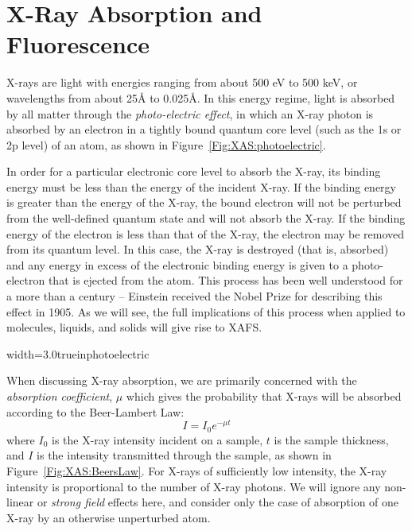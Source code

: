 \section{X-Ray Absorption and Fluorescence}

X-rays are light with energies ranging from about 500 eV to 500 keV, or
wavelengths from about 25{\AA} to 0.025{\AA}.  In this energy regime, light
is absorbed by all matter through the \emph{photo-electric effect}, in
which an X-ray photon is absorbed by an electron in a tightly bound quantum
core level (such as the 1s or 2p level) of an atom, as shown in
Figure~\ref{Fig:XAS:photoelectric}.

In order for a particular electronic core level to absorb the X-ray, its
binding energy must be less than the energy of the incident X-ray.  If the
binding energy is greater than the energy of the X-ray, the bound electron
will not be perturbed from the well-defined quantum state and will not
absorb the X-ray.  If the binding energy of the electron is less than that
of the X-ray, the electron may be removed from its quantum level.  In this
case, the X-ray is destroyed (that is, absorbed) and any energy in excess
of the electronic binding energy is given to a photo-electron that is
ejected from the atom.  This process has been well understood for a more
than a century -- Einstein received the Nobel Prize for describing this
effect in 1905.  As we will see, the full implications of this process when
applied to molecules, liquids, and solids will give rise to XAFS.

\begin{Nfig}{width=3.0truein}{photoelectric}
  \caption{The photoelectric effect, in which an X-ray is absorbed by a
    atom and a core-level electron is promoted out of the atom, creating a
    photo-electron and leaving behind a hole in the core electron level.}
  \label{Fig:XAS:photoelectric}
\end{Nfig}

When discussing X-ray absorption, we are primarily concerned with the
\emph{absorption coefficient}, $\mu$ which gives the probability that
X-rays will be absorbed according to the Beer-Lambert Law:
\begin{equation}
  I=I_{0}e^{-{\mu}t}
\end{equation}
\noindent
where $I_{0}$ is the X-ray intensity incident on a sample, $t$ is the
sample thickness, and $I$ is the intensity transmitted through the sample,
as shown in Figure~\ref{Fig:XAS:BeersLaw}. For X-rays of sufficiently low
intensity, the X-ray intensity is proportional to the number of X-ray
photons.   We will ignore any non-linear or {\emph{strong field}} effects
here, and consider only the case of absorption of one X-ray by an otherwise
unperturbed atom.

